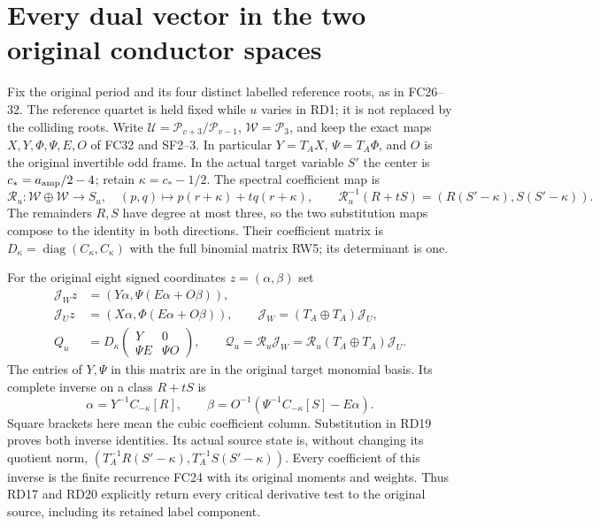 \documentclass[11pt]{article}
\begin{document}
\section{Every dual vector in the two original conductor spaces}
Fix the original period and its four distinct labelled reference
roots, as in FC26--32. The reference quartet is held fixed while
$u$ varies in RD1; it is not replaced by the colliding roots.
Write $\mathcal U=\mathcal P_{v+3}/\mathcal P_{v-1}$,
$\mathcal W=\mathcal P_3$, and keep the exact maps
$X,Y,\Phi,\Psi,E,O$ of FC32 and SF2--3. In particular
$Y=T_AX$, $\Psi=T_A\Phi$, and $O$ is the original invertible
odd frame. In the actual target variable $S'$ the center is
$c_*=a_{\rm amp}/2-4$; retain $\kappa=c_*-1/2$.
The spectral coefficient map is
\begin{equation}
 \mathcal R_u:\mathcal W\oplus\mathcal W\longrightarrow S_u,
 \quad(p,q)\longmapsto p(r+\kappa)+tq(r+\kappa),\qquad
 \mathcal R_u^{-1}(R+tS)=(R(S'-\kappa),S(S'-\kappa)).
 \tag{RD18}
\end{equation}
The remainders $R,S$ have degree at most three, so the
two substitution maps compose to the identity in both
directions. Their coefficient matrix is
$D_\kappa=\operatorname{diag}(C_\kappa,C_\kappa)$ with
the full binomial matrix RW5; its determinant is one.

For the original eight signed coordinates $z=(\alpha,\beta)$ set
\begin{align}
 \mathcal J_W z&=(Y\alpha,\Psi(E\alpha+O\beta)),\nonumber\\
 \mathcal J_U z&=(X\alpha,\Phi(E\alpha+O\beta)),\qquad
 \mathcal J_W=(T_A\oplus T_A)\mathcal J_U,\nonumber\\
 Q_u&=D_\kappa
 \begin{pmatrix}Y&0\\\Psi E&\Psi O\end{pmatrix},\qquad
 \mathcal Q_u=\mathcal R_u\mathcal J_W
      =\mathcal R_u(T_A\oplus T_A)\mathcal J_U .
 \tag{RD19}
\end{align}
The entries of $Y,\Psi$ in this matrix are in the original
target monomial basis. Its complete inverse on a class
$R+tS$ is
\begin{equation}
 \alpha=Y^{-1}C_{-\kappa}[R],\qquad
 \beta=O^{-1}\left(\Psi^{-1}C_{-\kappa}[S]-E\alpha\right).
 \tag{RD20}
\end{equation}
Square brackets here mean the cubic coefficient column.
Substitution in RD19 proves both inverse identities. Its
actual source state is, without changing its quotient norm,
$(T_A^{-1}R(S'-\kappa),T_A^{-1}S(S'-\kappa))$.
Every coefficient of this inverse is the finite recurrence
FC24 with its original moments and weights. Thus RD17 and
RD20 explicitly return every critical derivative test to
the original source, including its retained label component.
\end{document}
